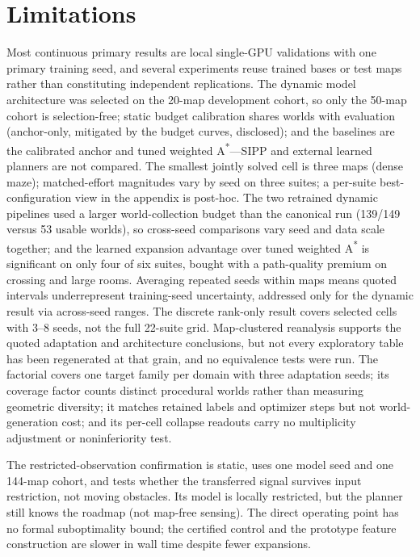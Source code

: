 \documentclass[letterpaper]{article} %
\begin{document}
\section{Limitations}

Most continuous primary results are local single-GPU validations with one primary training seed, and several experiments reuse trained bases or test maps rather than constituting independent replications. The dynamic model architecture was selected on the 20-map development cohort, so only the 50-map cohort is selection-free; static budget calibration shares worlds with evaluation (anchor-only, mitigated by the budget curves, disclosed); and the baselines are the calibrated anchor and tuned weighted A\textsuperscript{*}---SIPP and external learned planners are not compared. The smallest jointly solved cell is three maps (dense maze); matched-effort magnitudes vary by seed on three suites; a per-suite best-configuration view in the appendix is post-hoc. The two retrained dynamic pipelines used a larger world-collection budget than the canonical run (139/149 versus 53 usable worlds), so cross-seed comparisons vary seed and data scale together; and the learned expansion advantage over tuned weighted A\textsuperscript{*} is significant on only four of six suites, bought with a path-quality premium on crossing and large rooms. Averaging repeated seeds within maps means quoted intervals underrepresent training-seed uncertainty, addressed only for the dynamic result via across-seed ranges. The discrete rank-only result covers selected cells with 3--8 seeds, not the full 22-suite grid. Map-clustered reanalysis supports the quoted adaptation and architecture conclusions, but not every exploratory table has been regenerated at that grain, and no equivalence tests were run. The factorial covers one target family per domain with three adaptation seeds; its coverage factor counts distinct procedural worlds rather than measuring geometric diversity; it matches retained labels and optimizer steps but not world-generation cost; and its per-cell collapse readouts carry no multiplicity adjustment or noninferiority test.

The restricted-observation confirmation is static, uses one model seed and one 144-map cohort, and tests whether the transferred signal survives input restriction, not moving obstacles. Its model is locally restricted, but the planner still knows the roadmap (not map-free sensing). The direct operating point has no formal suboptimality bound; the certified control and the prototype feature construction are slower in wall time despite fewer expansions.
\end{document}
